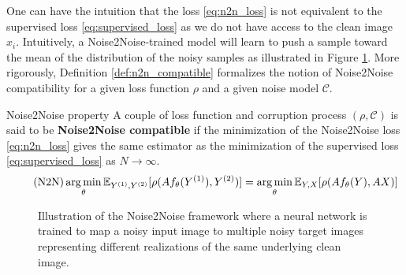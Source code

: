 One can have the intuition that the loss \eqref{eq:n2n_loss} is not equivalent to the supervised loss \eqref{eq:supervised_loss} as we do not have access to the clean image $x_i$.
Intuitively, a Noise2Noise-trained model will learn to push a sample toward the mean of the distribution of the noisy samples as illustrated in Figure \ref{fig:noise2noise}.
More rigorously, Definition \ref{def:n2n_compatible} formalizes the notion of Noise2Noise compatibility for a given loss function $\rho$ and a given noise model $\mathcal{C}$.
\begin{definition}{Noise2Noise property}
    \label{def:n2n_compatible}
    A couple of loss function and corruption process $(\rho, \mathcal{C})$ is said to be \textbf{Noise2Noise compatible} if the minimization of the Noise2Noise loss \eqref{eq:n2n_loss} gives the same estimator as the minimization of the supervised loss \eqref{eq:supervised_loss} as $N \to \infty$.
    \begin{equation}
        \label{eq:n2n_compatible}
        \tag{N2N}
        \mathop{\mathrm{arg\,min}}_\theta \mathbb{E}_{Y^{(1)}, Y^{(2)}}[\rho(Af_\theta(Y^{(1)}), Y^{(2)})] = \mathop{\mathrm{arg\,min}}_\theta \mathbb{E}_{Y, X}[\rho(Af_\theta(Y), AX)]
    \end{equation}
\end{definition}
\begin{figure}
    \centering
    \caption{Illustration of the Noise2Noise framework where a neural network is trained to map a noisy input image to multiple noisy target images representing different realizations of the same underlying clean image.}
    \label{fig:noise2noise}
\end{figure}

